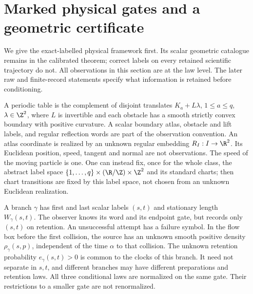 \section{Marked physical gates and a geometric certificate}
\label{sec:v80-framework}

We give the exact-labelled physical framework first.  Its scalar
geometric catalogue remains in the calibrated theorem; correct labels
on every retained scientific trajectory do not.  All observations in
this section are at the law level.  The later raw and finite-record
statements specify what information is retained before conditioning.

A periodic table is the complement of disjoint translates
$K_a+L\lambda$, $1\le a\le q$, $\lambda\in\Z^2$, where $L$ is
invertible and each obstacle has a smooth strictly convex boundary with
positive curvature.  A scalar boundary atlas, obstacle and lift labels,
and regular reflection words are part of the observation convention.
An atlas coordinate is realized by an unknown regular embedding
$R_I:I\to\R^2$.  Its Euclidean position, speed, tangent and normal are
not observations.  The speed of the moving particle is one.  One can
instead fix, once for the whole class, the abstract label space
$\{1,\ldots,q\}\times(\R/\Z)\times\Z^2$ and its standard charts;
then chart transitions are fixed by this label space, not chosen from
an unknown Euclidean realization.

A branch $\gamma$ has first and last scalar labels $(s,t)$ and
stationary length $W_\gamma(s,t)$.  The observer knows its word and its
endpoint gate, but records only $(s,t)$ on retention.  An unsuccessful
attempt has a failure symbol.  In the flow box before the first collision,
the source has an unknown smooth positive density $\rho_\gamma(s,p)$,
independent of the time $\alpha$ to that collision.  The unknown
retention probability $e_\gamma(s,t)>0$ is common to the clocks of this
branch.  It need not separate in $s,t$, and different branches may have
different preparations and retention laws.  All three conditional laws
are normalized on the same gate.  Their restrictions to a smaller gate
are not renormalized.

